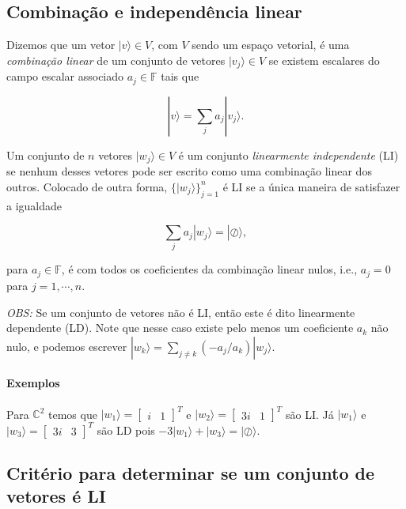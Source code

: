\documentclass[11pt]{article}
\begin{document}
    \subsection{Combinação e independência
linear}\label{combinauxe7uxe3o-e-independuxeancia-linear}

Dizemos que um vetor \(|v\rangle\in V\), com \(V\) sendo um espaço
vetorial, é uma \emph{combinação linear} de um conjunto de vetores
\(|v_{j}\rangle\in V\) se existem escalares do campo escalar associado
\(a_{j}\in\mathbb{F}\) tais que

\begin{equation}
|v\rangle = \sum_{j}a_{j}|v_{j}\rangle.
\end{equation}

Um conjunto de \(n\) vetores \(|w_{j}\rangle\in V\) é um conjunto
\emph{linearmente independente} (LI) se nenhum desses vetores pode ser
escrito como uma combinação linear dos outros. Colocado de outra forma,
\(\{|w_{j}\rangle\}_{j=1}^{n}\) é LI se a única maneira de satisfazer a
igualdade

\begin{equation}
\sum_{j}a_{j}|w_{j}\rangle=|\oslash\rangle,
\end{equation}

para \(a_{j}\in\mathbb{F}\), é com todos os coeficientes da combinação
linear nulos, i.e., \(a_{j}=0\) para \(j=1,\cdots,n\).

\emph{OBS:} Se um conjunto de vetores não é LI, então este é dito
linearmente dependente (LD). Note que nesse caso existe pelo menos um
coeficiente \(a_{k}\) não nulo, e podemos escrever
\(|w_{k}\rangle=\sum_{j\ne k}(-a_{j}/a_{k})|w_{j}\rangle\).

\paragraph{Exemplos}\label{exemplos}

Para \(\mathbb{C}^{2}\) temos que
\(|w_{1}\rangle=\begin{bmatrix} i & 1 \end{bmatrix}^{T}\) e
\(|w_{2}\rangle=\begin{bmatrix} 3i & 1 \end{bmatrix}^{T}\) são LI. Já
\(|w_{1}\rangle\) e
\(|w_{3}\rangle=\begin{bmatrix} 3i & 3 \end{bmatrix}^{T}\) são LD pois
\(-3|w_{1}\rangle+|w_{3}\rangle=|\oslash\rangle\).

    \subsection{Critério para determinar se um conjunto de vetores é
LI}\label{crituxe9rio-para-determinar-se-um-conjunto-de-vetores-uxe9-li}
\end{document}
